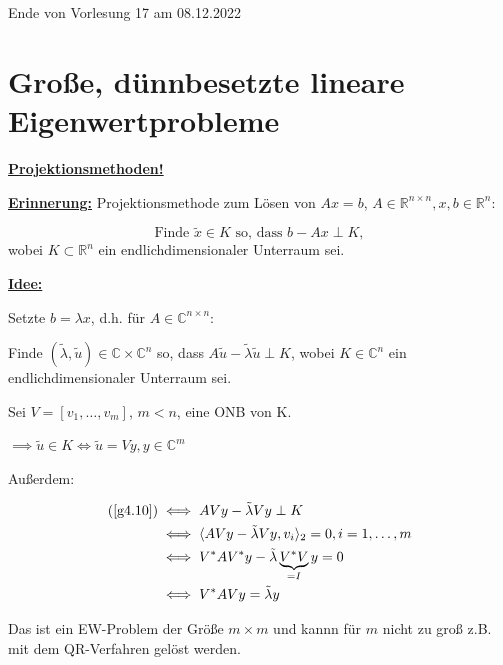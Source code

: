 \documentclass{book}
\def\C{\mathbb{C}}
\def\R{\mathbb{R}}
\begin{document}
            

            \noindent
            \xrfill[0.7ex]{1pt}Ende von Vorlesung 17 am 08.12.2022\xrfill[0.7ex]{1pt}
            
        \section{Große, dünnbesetzte lineare Eigenwertprobleme}

            \underline{\textbf{Projektionsmethoden!}} 

            \underline{\textbf{Erinnerung:}} Projektionsmethode zum Lösen von $Ax=b$, $A\in\R^{n\times n},x,b\in\R^n$:

            \begin{equation}\label{g4.10}%
                \text{Finde }\tilde{x}\in K\text{ so, dass }b-Ax\perp K,
            \end{equation}
            wobei $K\subset \R^n$ ein endlichdimensionaler Unterraum sei.

            \underline{\textbf{Idee:}}

            Setzte $b=\lambda x$, d.h. für $A\in\C^{n\times n}$:

            Finde $(\tilde{\lambda},\tilde{u})\in \C\times \C^n$ so, dass $A\tilde{u}-\tilde{\lambda} \tilde{u}\perp K$,
            wobei $K\in\C^n$ ein endlichdimensionaler Unterraum sei.

            Sei $V=[v_1,\dots,v_m]$, $m<n$, eine ONB von K. 

            $\implies \tilde{u}\in K \iff \tilde{u}=Vy,y\in\C^m$

            Außerdem: 

            \begin{align}\label{g4.11}%
                (\ref{g4.10}) &\iff AVy-\tilde{\lambda}Vy\perp K\notag\\
                &\iff \langle AVy-\tilde{\lambda}Vy,v_i \rangle_2=0,i=1,\dots,m\notag\\
                &\iff V^* A V^*y-\tilde{\lambda}\underbrace{V^*V}_{=I}y = 0\notag\\
                &\iff V^*A Vy=\tilde{\lambda}y 
            \end{align}

            Das ist ein EW-Problem der Größe $m\times m$ und kannn für $m$ nicht zu groß z.B. 
            mit dem QR-Verfahren gelöst werden.
\end{document}
